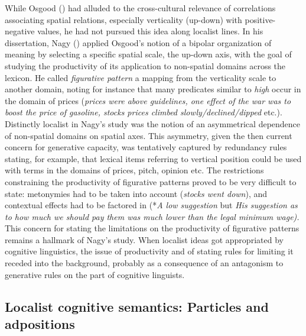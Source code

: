 \documentclass[output=paper]{langscibook}
\begin{document}
While Osgood (\citet{osgood_nature_1952}) had alluded to the cross-cultural relevance of correlations associating spatial relations, especially verticality (up-down) with positive-negative values, he had not pursued this idea along localist lines. In his dissertation, Nagy (\citeyear{nagy_figurative_1974}) applied Osgood’s notion of a bipolar organization of meaning by selecting a specific spatial scale, the up-down axis, with the goal of studying the productivity of its application to non-spatial domains across the lexicon. He called \textit{figurative pattern} a mapping from the verticality scale to another domain, noting for instance that many predicates similar to \textit{high} occur in the domain of prices (\textit{prices were above guidelines, one effect of the war was to boost the price of gasoline, stocks prices climbed slowly\slash declined\slash dipped} etc.). Distinctly localist in Nagy’s study was the notion of an asymmetrical dependence of non-spatial domains on spatial axes. This asymmetry, given the then current concern for generative capacity, was tentatively captured by redundancy rules stating, for example, that lexical items referring to vertical position could be used with terms in the domains of prices, pitch, opinion etc. The restrictions constraining the productivity of figurative patterns proved to be very difficult to state: metonymies had to be taken into account (\textit{stocks went down}), and contextual effects had to be factored in (*\textit{A low suggestion} but \textit{His suggestion as to how much we should pay them was much lower than the legal minimum wage).} This concern for stating the limitations on the productivity of figurative patterns remains a hallmark of Nagy’s study. When localist ideas got appropriated by cognitive linguistics, the issue of productivity and of stating rules for limiting it receded into the background, probably as a consequence of an antagonism to generative rules on the part of cognitive linguists. 

\subsection{Localist cognitive semantics: Particles and adpositions}
\end{document}
